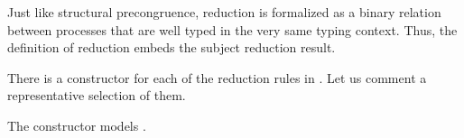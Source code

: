 Just like structural precongruence, reduction is formalized as a binary relation
between processes that are well typed in the very same typing context. Thus, the
definition of reduction embeds the subject reduction result.

\begin{AgdaAlign}
\begin{code}%
\>[0]\AgdaSpace{}%
\AgdaSpace{}%
\AgdaSymbol{\{}\AgdaSymbol{\}}\AgdaSpace{}%
\AgdaSymbol{:}\AgdaSpace{}%
\AgdaSpace{}%
\AgdaSpace{}%
\AgdaSpace{}%
\AgdaSpace{}%
\AgdaSpace{}%
\AgdaSpace{}%
\AgdaSpace{}%
\<%
\end{code}

There is a constructor for each of the reduction rules in .
Let us comment a representative selection of them.

The constructor  models \RLink. 

\begin{code}%
\>[0][@{}l@{\AgdaIndent{1}}]%
\>[2]%
\>[14]\AgdaSymbol{:}%
\>[238I]\AgdaSpace{}%
\AgdaSpace{}%
\AgdaSymbol{\}}\AgdaSpace{}%
\AgdaSymbol{\{}\AgdaSpace{}%
\AgdaSymbol{:}\AgdaSpace{}%
\AgdaSpace{}%
\AgdaSymbol{(}\AgdaSpace{}%
\AgdaSpace{}%
\AgdaSymbol{)\}}\<%
\\
\>[.][@{}l@{}]\<[238I]%
\>[16]\AgdaSymbol{(}\AgdaSpace{}%
\AgdaSymbol{:}\AgdaSpace{}%
\AgdaSpace{}%
\AgdaSpace{}%
\AgdaSymbol{)}\AgdaSpace{}%
\AgdaSymbol{(}\AgdaSpace{}%
\AgdaSymbol{:}\AgdaSpace{}%
\AgdaSpace{}%
\AgdaSpace{}%
\AgdaSymbol{)}\AgdaSpace{}%
\AgdaSymbol{(}\AgdaSpace{}%
\AgdaSymbol{:}\AgdaSpace{}%
\AgdaSpace{}%
\AgdaSpace{}%
\AgdaSpace{}%
\AgdaOperator{\AgdaFunction{,}}\AgdaSpace{}%
\AgdaSymbol{)}\AgdaSpace{}%
\<%
\\
%
\>[16]\AgdaSpace{}%
\AgdaSpace{}%
\AgdaSpace{}%
\AgdaSymbol{(}\AgdaSpace{}%
\AgdaSpace{}%
\AgdaSymbol{(}\AgdaSpace{}%
\AgdaSymbol{(}\AgdaSpace{}%
\AgdaSymbol{)))}\AgdaSpace{}%
\AgdaSpace{}%
\AgdaSpace{}%
\AgdaSpace{}%
\AgdaSymbol{(}\AgdaSpace{}%
\AgdaSymbol{)}\AgdaSpace{}%
\<%
\end{code}


\end{AgdaAlign}
